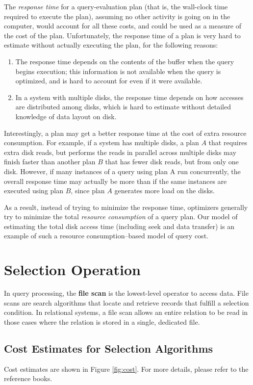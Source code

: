 \documentclass{vldb}
\newcommand{\be}{\begin{enumerate}}
\newcommand{\ee}{\end{enumerate}}
\newcommand{\ii}{\item}
\begin{document}
The \textit{response time} for a query-evaluation plan (that is, the wall-clock time required to execute the plan), assuming no other activity is going on in the
computer, would account for all these costs, and could be used as a measure of the cost of the plan. Unfortunately, the response time of a plan is very hard to
estimate without actually executing the plan, for the following reasons:

\be
\ii The response time depends on the contents of the buffer when the query
begins execution; this information is not available when the query is optimized,
and is hard to account for even if it were available.
\ii In a system with multiple disks, the response time depends on how accesses
are distributed among disks, which is hard to estimate without detailed
knowledge of data layout on disk.
\ee

Interestingly, a plan may get a better response time at the cost of extra resource
consumption. For example, if a system has multiple disks, a plan $A$ that requires
extra disk reads, but performs the reads in parallel across multiple disks may
finish faster than another plan $B$ that has fewer disk reads, but from only one
disk. However, if many instances of a query using plan A run concurrently, the
overall response time may actually be more than if the same instances are executed
using plan $B$, since plan $A$ generates more load on the disks.

As a result, instead of trying to minimize the response time, optimizers generally
try to minimize the total \textit{resource consumption} of a query plan. Our model
of estimating the total disk access time (including seek and data transfer) is an
example of such a resource consumption–based model of query cost.

\section{Selection Operation}

In query processing, the \textbf{file scan} is the lowest-level operator to access data. 
File scans are search algorithms that locate and retrieve records that fulfill a selection condition. 
In relational systems, a file scan allows an entire relation to be read in those cases where the relation is stored in a single, dedicated file.

\subsection{Cost Estimates for Selection Algorithms}
Cost estimates are shown in Figure \ref{fig:cost}. For more details, please refer to the reference books.
\end{document}
